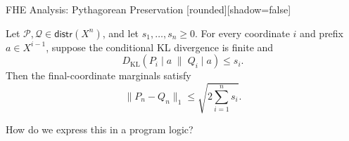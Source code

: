 \begin{frame}{FHE Analysis: Pythagorean Preservation}
  [rounded][shadow=false]
  \begin{lemma}
    Let $\mathcal P,\mathcal Q\in\mathsf{distr}(X^n)$,
    and let $s_1,\ldots,s_n\geq0$.
    For every coordinate $i$ and prefix $a\in X^{i-1}$, suppose the
    conditional KL divergence is finite and
    \[
      D_{\mathrm{KL}}(P_i\mid a\;\|\;Q_i\mid a)
        \leq s_i.
    \]
    Then the final-coordinate marginals satisfy
    \[
      \|P_n-Q_n\|_1
        \leq\sqrt{2\sum_{i=1}^{n}s_i}.
    \]
  \end{lemma}
  \pause
  \vspace{0.5em}
  \begin{center}
    How do we express this in a program logic?
  \end{center}
\end{frame}
